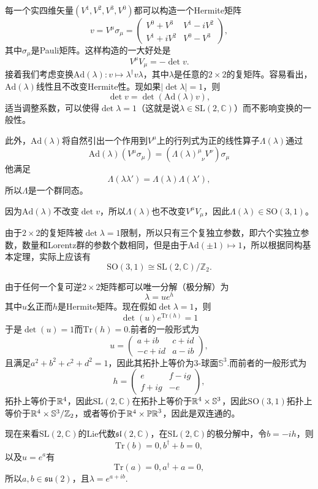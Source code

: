 每一个实四维矢量$(V^1,	V^2,V^3,V^0)$都可以构造一个Hermite矩阵
\[v=V^\mu\sigma_\mu=
\begin{pmatrix}
V^0+V^3&V^1-iV^2\\
V^1+iV^2&V^0-V^3
\end{pmatrix},
\]
其中$\sigma_\mu$是Pauli矩阵。这样构造的一大好处是
\[
V^\mu V_\mu=-\det v.
\]
接着我们考虑变换$\mathrm{Ad}(\lambda):v\mapsto \lambda^\dag v \lambda$，其中$ \lambda$是任意的$2\times2$的复矩阵。容易看出，$\mathrm{Ad}(\lambda)$线性且不改变Hermite性。现如果$|\det \lambda|=1$，则
\[
\det v=\det(\mathrm{Ad}(\lambda)v),
\]
适当调整系数，可以使得$\det \lambda=1$（这就是说$\lambda\in \mathrm{SL}(2,\mathbb{C})$）而不影响变换的一般性。

此外，$\mathrm{Ad}(\lambda)$将自然引出一个作用到$V^\mu$上的行列式为正的线性算子$\Lambda(\lambda)$通过
\[\mathrm{Ad}(\lambda)(V^\mu\sigma_\mu)=(\Lambda(\lambda)^\mu_{\phantom{\mu}\nu}V^\nu)\sigma_\mu\]
他满足
\[
\Lambda(\lambda\lambda')=\Lambda(\lambda)\Lambda(\lambda'),
\]
所以$\Lambda$是一个群同态。

因为$\mathrm{Ad}(\lambda)$不改变$\det v$，所以$\Lambda(\lambda)$也不改变$V^\mu V_\mu$，因此$\Lambda(\lambda)\in \mathrm{SO}(3,1)$。

由于$2\times 2$的复矩阵被$\det \lambda=1$限制，所以只有三个复独立参数，即六个实独立参数，数量和Lorentz群的参数个数相同，但是由于$\mathrm{Ad}(\pm 1)\mapsto 1$，所以根据同构基本定理，实际上应该有
\[
\mathrm{SO}(3,1)\cong \mathrm{SL}(2,\mathbb{C})/\mathbb{Z}_2.
\]

由于任何一个复可逆$2\times 2$矩阵都可以唯一分解（极分解）为
\[
\lambda=ue^{h}
\]
其中$u$幺正而$h$是Hermite矩阵。现在假如$\det \lambda=1$，则
\[
\det(u)e^{\mathrm{Tr}(h)}=1
\]
于是$\det(u)=1$而$\mathrm{Tr}(h)=0$.前者的一般形式为
\[
u=
\begin{pmatrix}
a+ib&c+id\\
-c+id&a-ib
\end{pmatrix},
\]
且满足$a^2+b^2+c^2+d^2=1$，因此其拓扑上等价为3-球面$\mathbb{S}^3$.而前者的一般形式为
\[
h=\begin{pmatrix}
e&f-ig\\
f+ig&-e
\end{pmatrix},
\]
拓扑上等价于$\mathbb{R}^4$，因此$\mathrm{SL}(2,\mathbb{C})$在拓扑上等价于$\mathbb{R}^4\times \mathbb{S}^3$，因此$\mathrm{SO}(3,1)$拓扑上等价于$\mathbb{R}^4\times \mathbb{S}^3/\mathbb{Z}_2$，或者等价于$\mathbb{R}^4\times \mathbb{PR}^3$，因此是双连通的。

现在来看$\mathrm{SL}(2,\mathbb{C})$的Lie代数$\mathfrak{sl}(2,\mathbb{C})$，在$\mathrm{SL}(2,\mathbb{C})$的极分解中，令$b=-ih$，则
\[
\mathrm{Tr}(b)=0,b^\dag+b=0,
\]
以及$u=e^a$有
\[
\mathrm{Tr}(a)=0,a^\dag+a=0,
\]
所以$a,b\in\mathfrak{su}(2)$，且$\lambda=e^{a+ib}$.

